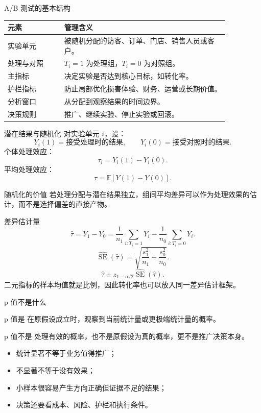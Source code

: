 \documentclass[UTF8,fontset=fandol,aspectratio=169,11pt]{ctexbeamer}
\begin{document}
\begin{frame}{A/B 测试的基本结构}
\begin{center}
\begin{tabular}{p{0.22\linewidth}p{0.64\linewidth}}
\toprule
元素 & 管理含义\\
\midrule
实验单元 & 被随机分配的访客、订单、门店、销售人员或客户。\\
处理与对照 & \(T_i=1\) 为处理组，\(T_i=0\) 为对照组。\\
主指标 & 决定实验是否达到核心目标，如转化率。\\
护栏指标 & 防止局部优化损害体验、财务、运营或长期价值。\\
分析窗口 & 从分配到观察结果的时间边界。\\
决策规则 & 推广、继续实验、停止实验或回滚。\\
\bottomrule
\end{tabular}
\end{center}
\end{frame}

\begin{frame}{潜在结果与随机化}
对实验单元 \(i\)，设：
\[
  Y_i(1)=\text{接受处理时的结果},
  \qquad
  Y_i(0)=\text{接受对照时的结果}.
\]
个体处理效应：
\[
  \tau_i=Y_i(1)-Y_i(0).
\]
平均处理效应：
\[
  \tau=\mathbb E[Y(1)-Y(0)].
\]
\begin{block}{随机化的价值}
若处理分配与潜在结果独立，组间平均差异可以作为处理效果的估计，而不是选择偏差的直接产物。
\end{block}
\end{frame}

\begin{frame}{差异估计量}
\[
  \hat\tau
  =\bar Y_1-\bar Y_0
  =
  \frac{1}{n_1}\sum_{i:T_i=1}Y_i
  -
  \frac{1}{n_0}\sum_{i:T_i=0}Y_i.
\]
\[
  \widehat{\operatorname{SE}}(\hat\tau)
  =
  \sqrt{\frac{s_1^2}{n_1}+\frac{s_0^2}{n_0}}.
\]
\[
  \hat\tau \pm z_{1-\alpha/2}\widehat{\operatorname{SE}}(\hat\tau).
\]
\small
二元指标的样本均值就是比例，因此转化率也可以放入同一差异估计框架。
\end{frame}

\begin{frame}{p 值不是什么}
\begin{block}{p 值是}
在原假设成立时，观察到当前统计量或更极端统计量的概率。
\end{block}
\begin{block}{p 值不是}
处理有效的概率，也不是原假设为真的概率，更不是推广决策本身。
\end{block}
\begin{itemize}
  \item 统计显著不等于业务值得推广；
  \item 不显著不等于没有效果；
  \item 小样本很容易产生方向正确但证据不足的结果；
  \item 决策还要看成本、风险、护栏和执行条件。
\end{itemize}
\end{frame}
\end{document}

